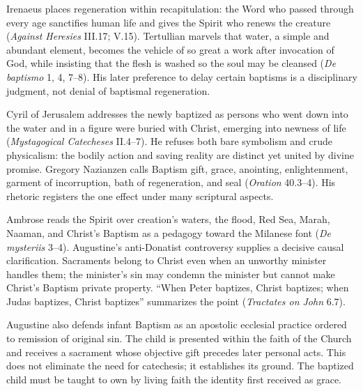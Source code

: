 Irenaeus places regeneration within recapitulation: the Word who passed through every age sanctifies human life and gives the Spirit who renews the creature (\emph{Against Heresies} III.17; V.15). Tertullian marvels that water, a simple and abundant element, becomes the vehicle of so great a work after invocation of God, while insisting that the flesh is washed so the soul may be cleansed (\emph{De baptismo} 1, 4, 7--8). His later preference to delay certain baptisms is a disciplinary judgment, not denial of baptismal regeneration.

Cyril of Jerusalem addresses the newly baptized as persons who went down into the water and in a figure were buried with Christ, emerging into newness of life (\emph{Mystagogical Catecheses} II.4--7). He refuses both bare symbolism and crude physicalism: the bodily action and saving reality are distinct yet united by divine promise. Gregory Nazianzen calls Baptism gift, grace, anointing, enlightenment, garment of incorruption, bath of regeneration, and seal (\emph{Oration} 40.3--4). His rhetoric registers the one effect under many scriptural aspects.

Ambrose reads the Spirit over creation's waters, the flood, Red Sea, Marah, Naaman, and Christ's Baptism as a pedagogy toward the Milanese font (\emph{De mysteriis} 3--4). Augustine's anti-Donatist controversy supplies a decisive causal clarification. Sacraments belong to Christ even when an unworthy minister handles them; the minister's sin may condemn the minister but cannot make Christ's Baptism private property. ``When Peter baptizes, Christ baptizes; when Judas baptizes, Christ baptizes'' summarizes the point (\emph{Tractates on John} 6.7).

Augustine also defends infant Baptism as an apostolic ecclesial practice ordered to remission of original sin. The child is presented within the faith of the Church and receives a sacrament whose objective gift precedes later personal acts. This does not eliminate the need for catechesis; it establishes its ground. The baptized child must be taught to own by living faith the identity first received as grace.

